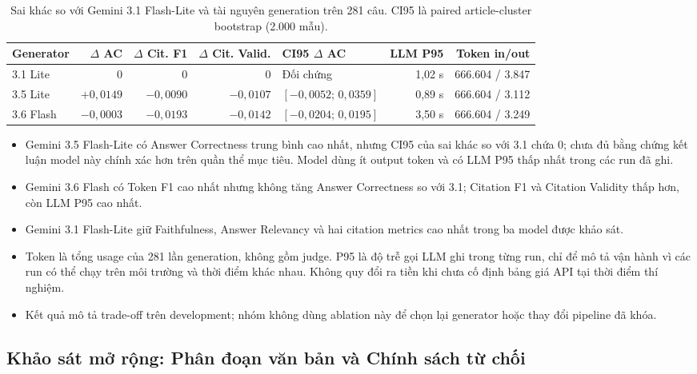 \begin{table}[H]
  \centering
  \caption{Sai khác so với Gemini 3.1 Flash-Lite và tài nguyên generation trên
  281 câu. CI95 là paired article-cluster bootstrap (2.000 mẫu).}
  \label{tab:phase2-generator-operation}
  \small
  \setlength{\tabcolsep}{3pt}
  \begin{tabular}{lrrrlrr}
    \toprule
    \textbf{Generator} & \textbf{$\Delta$ AC} & \textbf{$\Delta$ Cit. F1} &
    \textbf{$\Delta$ Cit. Valid.} & \textbf{CI95 $\Delta$ AC} &
    \textbf{LLM P95} & \textbf{Token in/out} \\
    \midrule
    3.1 Lite & 0 & 0 & 0 & Đối chứng & 1,02 s & 666.604 / 3.847 \\
    3.5 Lite & $+0,0149$ & $-0,0090$ & $-0,0107$ &
    $[-0,0052;\,0,0359]$ & 0,89 s & 666.604 / 3.112 \\
    3.6 Flash & $-0,0003$ & $-0,0193$ & $-0,0142$ &
    $[-0,0204;\,0,0195]$ & 3,50 s & 666.604 / 3.249 \\
    \bottomrule
  \end{tabular}
\end{table}

\begin{itemize}
  \item Gemini 3.5 Flash-Lite có Answer Correctness trung bình cao nhất, nhưng
  CI95 của sai khác so với 3.1 chứa 0; chưa đủ bằng chứng kết luận model này
  chính xác hơn trên quần thể mục tiêu. Model dùng ít output token và có LLM
  P95 thấp nhất trong các run đã ghi.
  \item Gemini 3.6 Flash có Token F1 cao nhất nhưng không tăng Answer
  Correctness so với 3.1; Citation F1 và Citation Validity thấp hơn, còn LLM
  P95 cao nhất.
  \item Gemini 3.1 Flash-Lite giữ Faithfulness, Answer Relevancy và hai citation
  metrics cao nhất trong ba model được khảo sát.
  \item Token là tổng usage của 281 lần generation, không gồm judge. P95 là độ
  trễ gọi LLM ghi trong từng run, chỉ để mô tả vận hành vì các run có thể chạy
  trên môi trường và thời điểm khác nhau. Không quy đổi ra tiền khi chưa cố
  định bảng giá API tại thời điểm thí nghiệm.
  \item Kết quả mô tả trade-off trên development; nhóm không dùng ablation này
  để chọn lại generator hoặc thay đổi pipeline đã khóa.
\end{itemize}

\subsection{Khảo sát mở rộng: Phân đoạn văn bản và Chính sách từ chối}
\label{sec:phase2-ablations}

